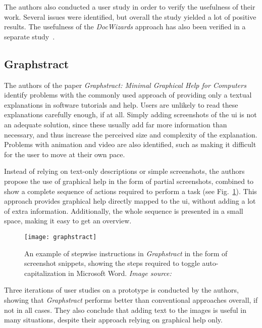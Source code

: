 \noindent
The authors also conducted a user study in order to verify the usefulness of their work. Several issues were identified, but overall the study yielded a lot of positive results. The usefulness of the \emph{DocWizards} approach has also been verified in a separate study~\cite{gweon:evaluating_docwizards}.

\subsection{Graphstract}
\label{sec:graphstract}
The authors of the paper \emph{Graphstract: Minimal Graphical Help for Computers}~\cite{huang:graphstract} identify problems with the commonly used approach of providing only a textual explanations in software tutorials and help. Users are unlikely to read these explanations carefully enough, if at all. Simply adding screenshots of the \gls{ui} is not an adequate solution, since these usually add far more information than necessary, and thus increase the perceived size and complexity of the explanation. Problems with animation and video are also identified, such as making it difficult for the user to move at their own pace.

\noindent
Instead of relying on text-only descriptions or simple screenshots, the authors propose the use of graphical help in the form of partial screenshots, combined to show a complete sequence of actions required to perform a task (see Fig.~\ref{fig:graphstract}). This approach provides graphical help directly mapped to the \gls{ui}, without adding a lot of extra information. Additionally, the whole sequence is presented in a small space, making it easy to get an overview.

\begin{figure}[htp]
	\centering
	\texttt{[image: graphstract]}
	\caption[\emph{Graphstract} example]{An example of stepwise instructions in \emph{Graphstract} in the form of screenshot snippets, showing the steps required to toggle auto-capitalization in Microsoft Word. \emph{Image source:~\cite{huang:graphstract}}}
	\label{fig:graphstract}
\end{figure}

\noindent
Three iterations of user studies on a prototype is conducted by the authors, showing that \emph{Graphstract} performs better than conventional approaches overall, if not in all cases. They also conclude that adding text to the images is useful in many situations, despite their approach relying on graphical help only.

